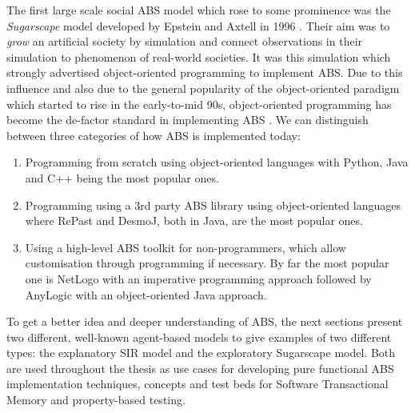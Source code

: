 The first large scale social ABS model which rose to some prominence was the \textit{Sugarscape} model developed by Epstein and Axtell in 1996 \cite{epstein_growing_1996}. Their aim was to \textit{grow} an artificial society by simulation and connect observations in their simulation to phenomenon of real-world societies. It was this simulation which strongly advertised object-oriented programming to implement ABS. Due to this influence and also due to the general popularity of the object-oriented paradigm which started to rise in the early-to-mid 90s, object-oriented programming has become the de-factor standard in implementing ABS . We can distinguish between three categories of how ABS is implemented today: %
\begin{enumerate}
	\item Programming from scratch using object-oriented languages with Python, Java and C++ being the most popular ones.
	\item Programming using a 3rd party ABS library using object-oriented languages where RePast and DesmoJ, both in Java, are the most popular ones.
	\item Using a high-level ABS toolkit for non-programmers, which allow customisation through programming if necessary. By far the most popular one is NetLogo with an imperative programming approach followed by AnyLogic with an object-oriented Java approach.
\end{enumerate}

To get a better idea and deeper understanding of ABS, the next sections present two different, well-known agent-based models to give examples of two different types: the explanatory SIR model and the exploratory Sugarscape model. Both are used throughout the thesis as use cases for developing pure functional ABS implementation techniques, concepts and test beds for Software Transactional Memory and property-based testing.




